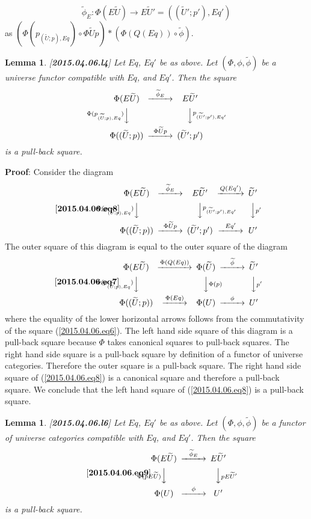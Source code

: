 \documentclass[12pt]{article}
\newenvironment{eq}{\begin{equation}}{\end{equation}}
\newenvironment{myproof}{{\bf Proof}:}{\vskip 5mm }
\newtheorem{lemma}[proposition]{Lemma}
\newcommand{\llabel}[1]{\label{#1}[{\bf #1}]}
\newcommand{\sr}{\rightarrow}
\newcommand{\wt}{\widetilde}
\begin{document}
%
$$\wt{\phi}_{E}:\Phi(E\wt{U})\sr E\wt{U}'=((\wt{U}';p'),Eq')$$
%
as $(\Phi(p_{(\wt{U};p),Eq})\circ \Phi\wt{U}p)*(\Phi(Q(Eq))\circ \wt{\phi})$. 
%
\begin{lemma}
\llabel{2015.04.06.l4}
Let $Eq$, $Eq'$ be as above. Let $(\Phi,\phi,\wt{\phi})$ be a universe functor compatible with $Eq$, and $Eq'$. Then the square
%
$$
\begin{CD}
\Phi(E\wt{U}) @>\wt{\phi}_{E}>> E\wt{U}'\\
@V\Phi(p_{(\wt{U};p),Eq}) VV @VV p_{(\wt{U}';p'),Eq'}V\\
\Phi((\wt{U};p)) @>\Phi\wt{U}p>> (\wt{U}';p')
\end{CD}
$$
%
is a pull-back square.
%
\end{lemma} 
%
\begin{myproof}
Consider the diagram
%
\begin{eq}\llabel{2015.04.06.eq8}
\begin{CD}
\Phi(E\wt{U}) @>\wt{\phi}_{E}>> E\wt{U}' @>Q(Eq')>> \wt{U}'\\
@V\Phi(p_{(\wt{U};p),Eq}) VV @VV p_{(\wt{U}';p'),Eq'}V @VVp'V\\
\Phi((\wt{U};p)) @>\Phi\wt{U}p>> (\wt{U}';p') @>Eq'>> U'
\end{CD}
\end{eq}
%
The outer square of this diagram is equal to the outer square of the diagram
%
\begin{eq}\llabel{2015.04.06.eq7}
\begin{CD}
\Phi(E\wt{U}) @>\Phi(Q(Eq))>> \Phi(\wt{U}) @>\wt{\phi}>> \wt{U}'\\
@V\Phi(p_{(\wt{U};p),Eq}) VV @VV \Phi(p)V @VVp'V\\
\Phi((\wt{U};p)) @>\Phi(Eq)>> \Phi(U) @>\phi>> U'
\end{CD}
\end{eq}
%
where the equality of the lower horizontal arrows follows from the commutativity of the square (\ref{2015.04.06.eq6}). The left hand side square of this diagram is a pull-back square because $\Phi$ takes canonical squares to pull-back squares. The right hand side square is a pull-back square by definition of a functor of universe categories. Therefore the outer square is a pull-back square. The right hand side square of (\ref{2015.04.06.eq8}) is a canonical square and therefore a pull-back square. We conclude that the left hand square of (\ref{2015.04.06.eq8}) is a pull-back square.
\end{myproof}
%
\begin{lemma}
\llabel{2015.04.06.l6}
Let $Eq$, $Eq'$ be as above. Let $(\Phi,\phi,\wt{\phi})$ be a functor of universe categories compatible with $Eq$, and $Eq'$. Then the square
%
\begin{eq}\llabel{2015.04.06.eq9}
\begin{CD}
\Phi(E\wt{U}) @>\wt{\phi}_{E}>> E\wt{U}'\\
@V\Phi(pE\wt{U})VV @VV pE\wt{U}' V\\
\Phi(U) @>\phi>> U'
\end{CD}
\end{eq}
%
is a pull-back square.
%
\end{lemma} 
\end{document}
